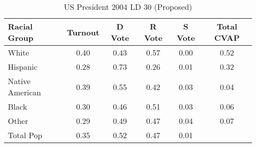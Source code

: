 \begin{table}[htb]
\begin{center}
\caption{US President 2004 LD 30 (Proposed)}
\label{pres04_cvap_ld_30}
\begin{tabular}{lccccc}
  \hline
Racial Group & Turnout & D Vote & R Vote & S Vote & Total CVAP \\ 
  \hline
White & 0.40 & 0.43 & 0.57 & 0.00 & 0.52 \\ 
  Hispanic & 0.28 & 0.73 & 0.26 & 0.01 & 0.32 \\ 
  Native American & 0.39 & 0.55 & 0.42 & 0.03 & 0.04 \\ 
  Black & 0.30 & 0.46 & 0.51 & 0.03 & 0.06 \\ 
  Other & 0.29 & 0.49 & 0.47 & 0.04 & 0.07 \\ 
  Total Pop & 0.35 & 0.52 & 0.47 & 0.01 &  \\ 
   \hline
\end{tabular}
\end{center}
\end{table}
